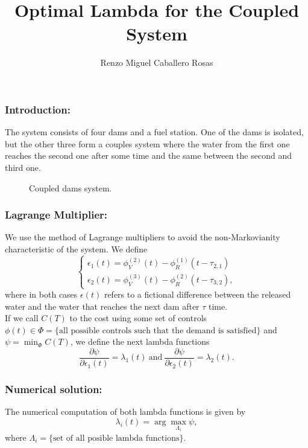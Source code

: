 \documentclass[aspectratio=169]{beamer}\usepackage[utf8]{inputenc}
\title{Optimal Lambda for the Coupled System}
\subtitle{Renzo Miguel Caballero Rosas}
\begin{document}
\begin{frame}
\titlepage
\end{frame}

\begin{frame}\frametitle{Introduction:}
The system consists of four dams and a fuel station. One of the dams is isolated, but the other three form a couples system where the water from the first one reaches the second one after some time and the same between the second and third one.
\begin{figure}[ht!]
\centering
{}
\caption{Coupled dams system.}
\end{figure}
\end{frame}

\begin{frame}\frametitle{Lagrange Multiplier:}
We use the method of Lagrange multipliers to avoid the non-Markovianity characteristic of the system. We define
\begin{equation*}
\begin{cases}
\epsilon_1(t)=\phi_V^{(2)}(t)-\phi_R^{(1)}(t-\tau_{2,1})\\
\epsilon_2(t)=\phi_V^{(3)}(t)-\phi_R^{(2)}(t-\tau_{3,2}),
\end{cases}
\end{equation*}
where in both cases $\epsilon(t)$ refers to a fictional difference between the released water and the water that reaches the next dam after $\tau$ time.\\
If we call $C(T)$ to the cost using some set of controls $\phi(t)\in\Phi=\{\text{all possible controls such that the demand is satisfied}\}$ and $\psi=\min_{\Phi}C(T)$, we define the next lambda functions
\begin{equation*}
\frac{\partial\psi}{\partial\epsilon_1(t)}=\lambda_1(t)\ \text{and}\ \frac{\partial\psi}{\partial\epsilon_2(t)}=\lambda_2(t).
\end{equation*}
\end{frame}

\begin{frame}\frametitle{Numerical solution:}
The numerical computation of both lambda functions is given by
\begin{equation*}
\lambda_i(t)=\arg\max_{\Lambda_i}\psi,
\end{equation*}
where $\Lambda_i=\{\text{set of all posible lambda functions}\}$.
\end{frame}
\end{document}
